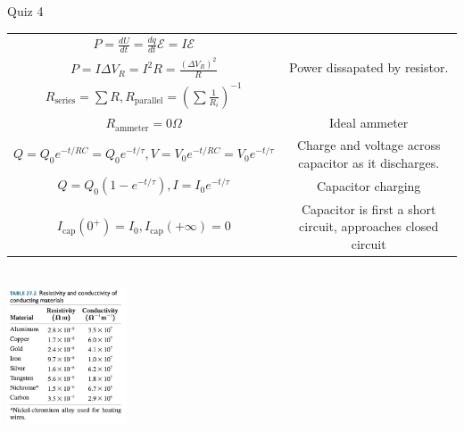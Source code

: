 \documentclass{article}
\begin{document}
\begin{section}{Quiz 4}
\begin{tabular}{|c|c|}
	 $P = \frac{dU}{dt} = \frac{dq}{dt} \mathcal E = I \mathcal E$                          &                                                                     \\

	 $P = I \Delta V_R = I^2 R = \frac{(\Delta V_R)^2}{R}$                                  & Power dissapated by resistor.                                       \\

	 $R_\text{series} = \sum R, R_\text{parallel} = \left( \sum \frac{1}{R_i} \right)^{-1}$ &                                                                     \\

	 $R_\text{ammeter} = 0 \Omega $                                                         & Ideal ammeter                                                       \\

	 $Q = Q_0 e^{-t/RC} = Q_0 e^{-t/\tau}, V = V_0 e^{-t/RC} = V_0 e^{-t/\tau}$             & Charge and voltage across capacitor as it discharges.               \\

	 $Q = Q_0 (1 - e^{-t / \tau}), I = I_0 e^{-t / \tau}$                                   & Capacitor charging                                                  \\

	 $I_\text{cap}(0^+) = I_0, I_\text{cap}(+\infty) = 0$                                   & Capacitor is first a short circuit, approaches closed circuit       \\

	 \hline
 \end{tabular}
 \\
 \includegraphics[width=100pt]{final_cheet_sheet_resources/ixfgtziofqygfpdtukouoiqdzfbfaoed.jpg}
\end{section}
\end{document}
